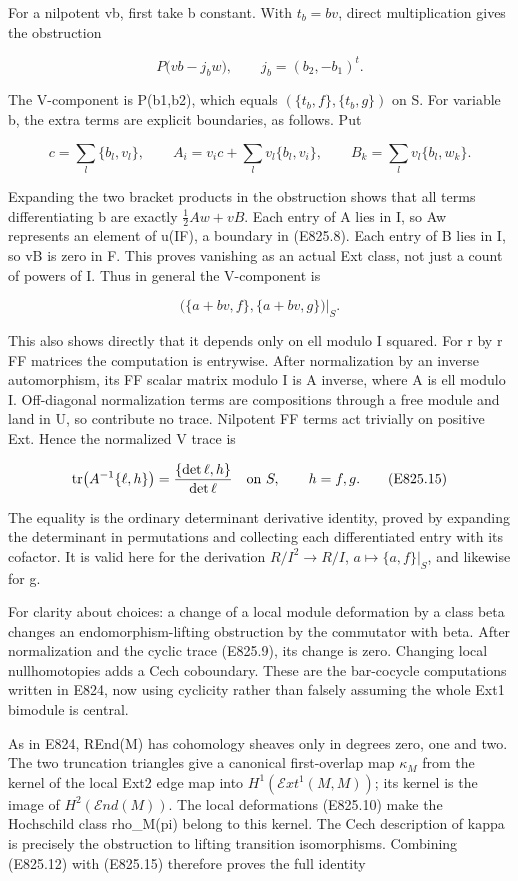 For a nilpotent vb, first take b constant. With \(t_b=bv\), direct
multiplication gives the obstruction

\[
 P\bigl(vb-j_bw\bigr),\qquad j_b=(b_2,-b_1)^t.
 \tag{E825.13}
\]

The V-component is P(b1,b2), which equals \((\{t_b,f\},\{t_b,g\})\) on
S. For variable b, the extra terms are explicit boundaries, as follows.
Put

\[
 c=\sum_l\{b_l,v_l\},\qquad
 A_i=v_i c+\sum_l v_l\{b_l,v_i\},\qquad
 B_k=\sum_l v_l\{b_l,w_k\}.
 \tag{E825.13a}
\]

Expanding the two bracket products in the obstruction shows that all
terms differentiating b are exactly \(\frac12 A w+vB\). Each entry of A
lies in I, so Aw represents an element of u(IF), a boundary in (E825.8).
Each entry of B lies in I, so vB is zero in F. This proves vanishing as
an actual Ext class, not just a count of powers of I. Thus in general
the V-component is

\[
 \bigl(\{a+bv,f\},\{a+bv,g\}\bigr)|_S.
 \tag{E825.14}
\]

This also shows directly that it depends only on ell modulo I squared.
For r by r FF matrices the computation is entrywise. After normalization
by an inverse automorphism, its FF scalar matrix modulo I is A inverse,
where A is ell modulo I. Off-diagonal normalization terms are
compositions through a free module and land in U, so contribute no
trace. Nilpotent FF terms act trivially on positive Ext. Hence the
normalized V trace is

\[
 \operatorname{tr}\bigl(A^{-1}\{\ell,h\}\bigr)
   =\frac{\{\det\ell,h\}}{\det\ell}
 \quad\hbox{on }S,\qquad h=f,g.
 \tag{E825.15}
\]

The equality is the ordinary determinant derivative identity, proved by
expanding the determinant in permutations and collecting each
differentiated entry with its cofactor. It is valid here for the
derivation \(R/I^2\to R/I\), \(a\mapsto\{a,f\}|_S\), and likewise for g.

For clarity about choices: a change of a local module deformation by a
class beta changes an endomorphism-lifting obstruction by the commutator
with beta. After normalization and the cyclic trace (E825.9), its change
is zero. Changing local nullhomotopies adds a Cech coboundary. These are
the bar-cocycle computations written in E824, now using cyclicity rather
than falsely assuming the whole Ext1 bimodule is central.

As in E824, REnd(M) has cohomology sheaves only in degrees zero, one and
two. The two truncation triangles give a canonical first-overlap map
\(\kappa_M\) from the kernel of the local Ext2 edge map into
\(H^1(\mathcal E xt^1(M,M))\); its kernel is the image of
\(H^2(\mathcal E nd(M))\). The local deformations (E825.10) make the
Hochschild class rho\_M(pi) belong to this kernel. The Cech description
of kappa is precisely the obstruction to lifting transition
isomorphisms. Combining (E825.12) with (E825.15) therefore proves the
full identity

